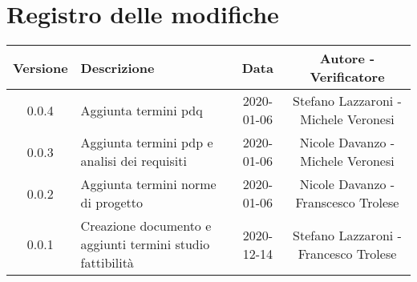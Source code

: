 \section*{Registro delle modifiche}

\begin{center}
	\begin{longtable}{|c|p{5cm}|c|c|}
	\hline
	\rowcolor{lighter-grayer}
	\textbf{Versione} & \textbf{Descrizione} & \textbf{Data} & \textbf{Autore - Verificatore} \\
	\hline
	\endfirsthead


	\hline
	0.0.4 & Aggiunta termini pdq& 2020-01-06 & Stefano Lazzaroni - Michele Veronesi\\
	0.0.3 & Aggiunta termini pdp e analisi dei requisiti & 2020-01-06 & Nicole Davanzo - Michele Veronesi\\
	0.0.2 & Aggiunta termini norme di progetto & 2020-01-06 & Nicole Davanzo -  Franscesco Trolese\\
	0.0.1 & Creazione documento e aggiunti termini studio fattibilità & 2020-12-14 & Stefano Lazzaroni - Francesco Trolese\\
	\hline

	\end{longtable}
\end{center}